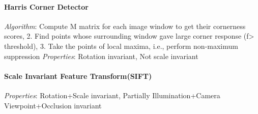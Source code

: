 \documentclass{article}
\begin{document}
\begin{multicols*}{2}
        \paragraph*{Harris Corner Detector}
        \textit{Algorithm}: Compute M matrix for each image window to get their cornerness scores, 2. Find points
        whose surrounding window gave large corner response (f> threshold), 3. Take the points of local maxima, i.e.,
        perform non-maximum suppression\newline
        \textit{Properties}: Rotation invariant, Not scale invariant
        \paragraph*{Scale Invariant Feature Transform(SIFT)}
        \textit{Properties}: Rotation+Scale invariant, Partially Illumination+Camera Viewpoint+Occlusion invariant\newline
    \end{multicols*}
\end{document}
